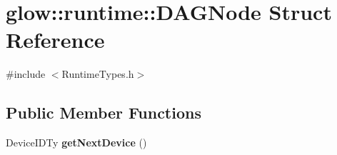 \hypertarget{structglow_1_1runtime_1_1_d_a_g_node}{}\section{glow\+:\+:runtime\+:\+:D\+A\+G\+Node Struct Reference}
\label{structglow_1_1runtime_1_1_d_a_g_node}


{\ttfamily \#include $<$Runtime\+Types.\+h$>$}

\subsection*{Public Member Functions}
\begin{DoxyCompactItemize}
\item 
\mbox{\label{structglow_1_1runtime_1_1_d_a_g_node_ac704552c942969fc24be9863c93b19e4}} 
Device\+I\+D\+Ty {\bfseries get\+Next\+Device} ()
\end{DoxyCompactItemize}
